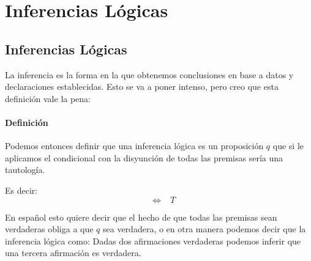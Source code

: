 \documentclass[12pt, fleqn]{report}                             %
\DeclareMathOperator \Space {\quad}                             %
\DeclareMathOperator \MiniSpace {\;}                            %
\newcommand \lequal {\MiniSpace \Leftrightarrow \MiniSpace}     %
\begin{document}
    \clearpage
    \chapter{Inferencias Lógicas}
        \clearpage

        
        \section{Inferencias Lógicas}

            La inferencia es la forma en la que obtenemos conclusiones en base a datos y declaraciones establecidas.
            Esto se va a poner intenso, pero creo que esta definición vale la pena:

            \subsubsection{Definición}

                Podemos entonces definir que una inferencia lógica es un proposición $q$ que si le aplicamos
                el condicional con la disyunción de todas las premisas sería una tautología.

                Es decir:
                \begin{equation*}
                    [p_1 \land p_2 \land p_3 \dots \to q] \lequal T
                \end{equation*}

                En español esto quiere decir que el hecho de que todas las premisas sean verdaderas obliga a
                que $q$ sea verdadera, o en otra manera podemos decir que la inferencia lógica como: 
                Dadas dos afirmaciones verdaderas podemos inferir que una tercera afirmación es verdadera.


\end{document}
